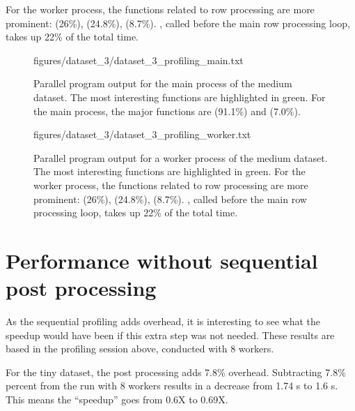 For the worker process, the functions related to row processing are more prominent:  (26\%),  (24.8\%), 
(8.7\%). , called before the main row processing loop, takes up 22\% of the total time.

\begin{figure}[ht]
  \begin{VerbatimInput}{figures/dataset_3/dataset_3_profiling_main.txt}
    \caption[Parallel program  output for the main process of the medium dataset.]{Parallel program  output for the main process of the medium dataset.
    The most interesting functions are highlighted in green.
For the main process, the major functions are  (91.1\%) and  (7.0\%).}
  \label{fig:profiler_medium_main}
\end{VerbatimInput}
\end{figure}

\begin{figure}[ht]
  \begin{VerbatimInput}{figures/dataset_3/dataset_3_profiling_worker.txt}
    \caption[Parallel program  output for a worker process of the medium dataset.]{Parallel program  output for a worker process of the medium dataset.
    The most interesting functions are highlighted in green.
For the worker process, the functions related to row processing are more prominent:  (26\%),  (24.8\%), 
(8.7\%). , called before the main row processing loop, takes up 22\% of the total time.}
  \label{fig:profiler_medium_worker}
\end{VerbatimInput}
\end{figure}

\section{Performance without sequential post processing}
As the sequential profiling adds overhead, it is interesting to see what the speedup would have been if this extra step was not needed.
These results are based in the profiling session above, conducted with 8 workers.

For the tiny dataset, the post processing adds 7.8\% overhead. Subtracting 7.8\% percent from the run with 8 workers results in a decrease
from 1.74 s to 1.6 s. This means the ``speedup'' goes from 0.6X to 0.69X.

